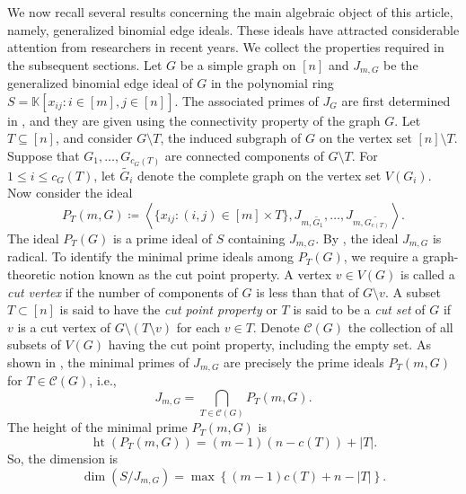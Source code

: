 \documentclass[12pt,reqno]{amsart}
\newcommand \K{\mathbb{K}}
\DeclareMathOperator{\height}{ht}
\theoremstyle{plain}
\theoremstyle{definition}
\begin{document}
We now recall several results concerning the main algebraic object of this article, namely, generalized binomial edge ideals. These ideals have attracted considerable attention from researchers in recent years. We collect the properties required in the subsequent sections. Let $G$ be a simple graph on $[n]$ and $J_{m,G}$ be the generalized binomial edge ideal of $G$ in the polynomial ring $S=\K[x_{ij}:i\in [m],j\in [n]]$. The associated primes of $J_G$ are first determined in \cite{GBI-Rauh-2013}, and they are given using the connectivity property of the graph $G$. Let $T\subseteq [n]$, and consider $G\setminus T$, the induced subgraph of $G$ on the vertex set $[n]\setminus T$. Suppose that $G_1,\ldots , G_{c_G(T)}$ are connected components of $G\setminus T$. For $1\leq i\leq c_G(T)$, let $\widetilde{G_i}$ denote the complete graph on the vertex set $V(G_i)$. Now consider the ideal 
    \[
    P_T(m,G)\coloneqq \left \langle \{x_{ij}:(i,j)\in [m]\times T\} , J_{m,\widetilde{G_1}}, \ldots ,  J_{m,\widetilde{G_{c(T)}}}  \right\rangle.
    \]
    The ideal $P_T(G)$ is a prime ideal of $S$ containing $J_{m,G}$. By \cite[Corollary 4]{GBI-Rauh-2013}, the ideal $J_{m,G}$ is radical. To identify the minimal prime ideals among $P_T(G)$, we require a graph-theoretic notion known as the cut point property. A vertex $v\in V(G)$ is called a \emph{cut vertex} if the number of components of $G$ is less than that of $G\setminus v$. A subset $T\subset [n]$ is said to have the \emph{cut point property} or $T$ is said to be a \emph{cut set} of $G$ if $v$ is a cut vertex of $G\setminus(T\setminus v)$ for each $v\in T$. Denote $\mathscr C(G)$ the collection of all subsets of $V(G)$ having the cut point property, including the empty set. As shown in \cite[Theorem 7]{GBI-Rauh-2013}, the minimal primes of $J_{m,G}$ are precisely the prime ideals $P_T(m,G)$ for $T\in \mathscr{C}(G)$, i.e., $$J_{m, G}=\bigcap_{T\in \mathscr C(G)}P_T(m,G).$$ The height of the minimal prime $P_T(m,G)$ is $$\height(P_{T}(m,G))=(m-1)(n-c(T))+|T|.$$
So, the dimension is $$\dim(S/J_{m,G})=\max\left\{(m-1)c(T)+n-|T|\right\}.$$ 
\end{document}
